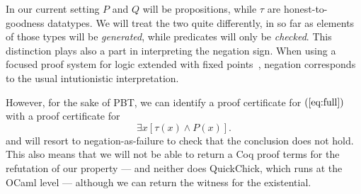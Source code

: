 In our current setting $P$ and $Q$ will be  propositions, while $\tau$   are honest-to-goodness datatypes. We will treat the two quite differently, in so far as elements of those types will be \emph{generated}, while predicates will only be \emph{checked}. This distinction plays also a part in interpreting the negation sign.
%
When using a focused proof system for logic extended with fixed
points~\cite{baelde12tocl}, negation corresponds to the usual intutionistic interpretation.  %

%
However, for the sake of PBT, we can identify a proof certificate for
$(\ref{eq:full})$ with a proof certificate for
\[
  \exists x [\tau(x)\wedge P(x)].
  \tag{**}\label{eq:short}
\]
and will resort to negation-as-failure to check that the conclusion does not hold. This also means that we will not be able to return a Coq proof terms for the refutation of our property --- and neither does \textsf{QuickChick}, which runs at the OCaml level --- although we can return the witness for the existential.
%

